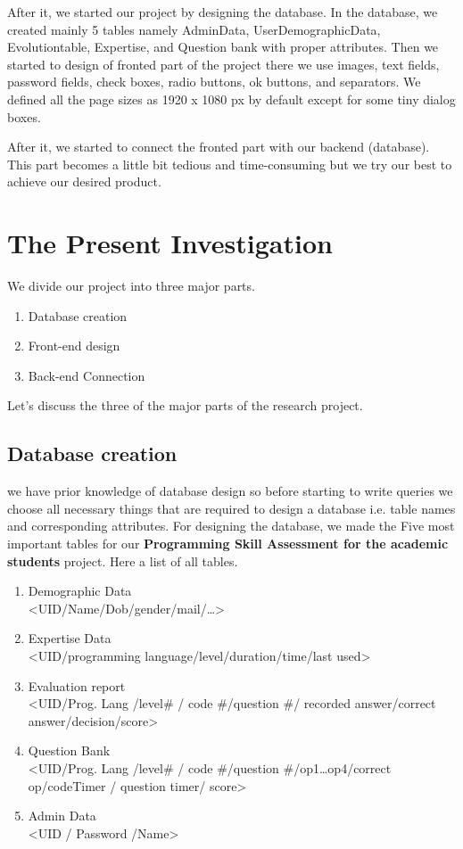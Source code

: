 \documentclass[10pt,a4paper,openright]{IEEEtran}
\newcounter{Question} %
\begin{document}
After it, we started our project by designing the database. In the database, we created mainly 5 tables namely AdminData, UserDemographicData, Evolutiontable, Expertise, and Question bank with proper attributes. Then we started to design of fronted part of the project there we use images, text fields, password fields, check boxes, radio buttons, ok buttons, and separators. We defined all the page sizes as 1920 x 1080 px by default except for some tiny dialog boxes.

After it, we started to connect the fronted part with our backend (database). This part becomes a little bit tedious and time-consuming but we try our best to achieve our desired product. 

\section{The Present Investigation}
We divide our project into three major parts. 
\begin{enumerate}
    \item Database creation
    \item Front-end design
    \item Back-end Connection
\end{enumerate}
Let's discuss the three of the major parts of the research project. 
\subsection{Database creation}
we have prior knowledge of database design so before starting to write queries we choose all necessary things that are required to design a database i.e. table names and corresponding attributes. For designing the database, we made the Five most important tables for our \textbf{Programming Skill Assessment for the academic students} project. Here a list of all tables.
\begin{tcolorbox}
    \begin{enumerate}
    \item Demographic Data \\<UID/Name/Dob/gender/mail/…>
    \item Expertise Data \\ <UID/programming language/level/duration/time/last used>
    \item Evaluation report \\ <UID/Prog. Lang /level\# / code \#/question \#/ recorded answer/correct answer/decision/score>
    \item Question Bank \\ <UID/Prog. Lang /level\# / code \#/question \#/op1…op4/correct op/codeTimer / question timer/ score>
    \item Admin Data \\ <UID / Password /Name>
\end{enumerate}
\end{tcolorbox}
\end{document}
